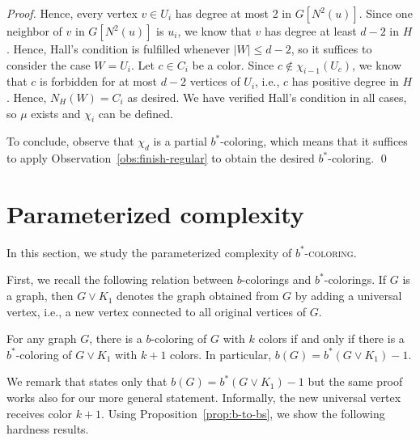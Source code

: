 \documentclass[runningheads, envcountsame]{llncs}
\newcommand{\bscoloring}{$b^*$-\textsc{coloring}\xspace}
\begin{document}
\begin{proof}
Hence, every vertex $v \in U_i$ has degree at most 2 in $G[N^2(u)]$.
Since one neighbor of $v$ in $G[N^2(u)]$ is $u_i$, we know that $v$ has degree at least $d-2$ in $H$.
Hence, Hall's condition is fulfilled whenever $|W| \le d-2$, so it suffices to consider the case $W = U_i$.
Let $c \in C_i$ be a color. Since $c \notin \chi_{i-1}(U_c)$, we know that $c$ is forbidden for at most $d-2$ vertices of $U_i$, i.e., $c$ has positive degree in $H$.
Hence, $N_H(W) = C_i$ as desired.
We have verified Hall's condition in all cases, so $\mu$ exists and $\chi_i$ can be defined.

To conclude, observe that $\chi_d$ is a partial $b^*$-coloring, which means that it suffices to apply Observation~\ref{obs:finish-regular} to obtain the desired $b^*$-coloring.
\qed\end{proof}

\setcounter{theorem}{\value{savedtheorem}}

\section{Parameterized complexity}\label{sec:par-complex}

In this section, we study the parameterized complexity of \bscoloring.

First, we recall the following relation between $b$-colorings and $b^*$-colorings. If $G$ is a graph, then $G \lor K_1$ denotes the graph obtained from $G$ by adding a universal vertex, i.e., a new vertex connected to all original vertices of $G$.

\begin{proposition}\label{prop:b-to-bs}
For any graph $G$, there is a $b$-coloring of $G$ with $k$ colors if and only if there is a $b^*$-coloring of $G \lor K_1$ with $k+1$ colors.
In particular, $b(G) = b^*(G \lor K_1) - 1$.
\end{proposition}

We remark that \cite[Proposition 4]{ZAKER2025370} states only that $b(G) = b^*(G \lor K_1) - 1$ but the same proof works also for our more general statement.
Informally, the new universal vertex receives color $k+1$. 
Using Proposition~\ref{prop:b-to-bs}, we show the following hardness results.
\end{document}
